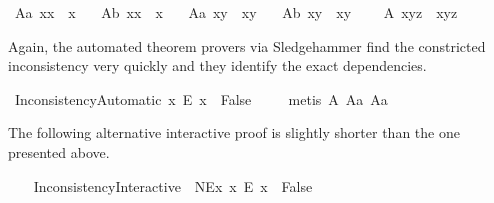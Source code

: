 \begin{isabellebody}
\ A{}a{\isacharcolon}\ {\isachardoublequoteopen}{\isacharparenleft}{\isasymbox}x{\isacharparenright}\isactrlbold {\isasymcdot}x\ {\isasymcong}\ x{\isachardoublequoteclose}\ \ \isanewline
\ A{}b{\isacharcolon}\ {\isachardoublequoteopen}x\isactrlbold {\isasymcdot}{\isacharparenleft}x{\isasymbox}{\isacharparenright}\ {\isasymcong}\ x{\isachardoublequoteclose}\ \ \isanewline
\ A{}a{\isacharcolon}\ {\isachardoublequoteopen}{\isasymbox}{\isacharparenleft}x\isactrlbold {\isasymcdot}y{\isacharparenright}\ {\isasymcong}\ {\isasymbox}{\isacharparenleft}x\isactrlbold {\isasymcdot}{\isacharparenleft}{\isasymbox}y{\isacharparenright}{\isacharparenright}{\isachardoublequoteclose}\ \ \isanewline
\ A{}b{\isacharcolon}\ {\isachardoublequoteopen}{\isacharparenleft}x\isactrlbold {\isasymcdot}y{\isacharparenright}{\isasymbox}\ {\isasymcong}\ {\isacharparenleft}{\isacharparenleft}x{\isasymbox}{\isacharparenright}\isactrlbold {\isasymcdot}y{\isacharparenright}{\isasymbox}{\isachardoublequoteclose}\ \ \isanewline
\ \ A{}{\isacharcolon}\ {\isachardoublequoteopen}x\isactrlbold {\isasymcdot}{\isacharparenleft}y\isactrlbold {\isasymcdot}z{\isacharparenright}\ {\isasymcong}\ {\isacharparenleft}x\isactrlbold {\isasymcdot}y{\isacharparenright}\isactrlbold {\isasymcdot}z{\isachardoublequoteclose}%
\begin{isamarkuptext}%
\label{subsec:FreydNotation} Again, the automated theorem provers via Sledgehammer 
       find the constricted inconsistency very quickly and they identify the  exact dependencies.%
\end{isamarkuptext}\isamarkuptrue%
\isamarkupfalse%
\ InconsistencyAutomatic{\isacharcolon}\ {\isachardoublequoteopen}{\isacharparenleft}{\isasymexists}x{\isachardot}\ \isactrlbold {\isasymnot}{\isacharparenleft}E\ x{\isacharparenright}{\isacharparenright}\ \isactrlbold {\isasymrightarrow}\ False{\isachardoublequoteclose}\ \isanewline
%
\isadelimproof
\ \ %
\endisadelimproof
%
\isatagproof
{}\isamarkupfalse%
\ {\isacharparenleft}metis\ A{}\ A{}a\ A{}a{\isacharparenright}%
\endisatagproof
{\isafoldproof}%
%
\isadelimproof
%
\endisadelimproof
%
\begin{isamarkuptext}%
The following alternative interactive proof is slightly shorter than the one 
        presented above.%
\end{isamarkuptext}\isamarkuptrue%
\ \ \isamarkupfalse%
\ InconsistencyInteractive{\isacharcolon}\ \ NEx{\isacharcolon}\ {\isachardoublequoteopen}{\isasymexists}x{\isachardot}\ \isactrlbold {\isasymnot}{\isacharparenleft}E\ x{\isacharparenright}{\isachardoublequoteclose}\ \ False\ \isanewline

\end{isabellebody}
